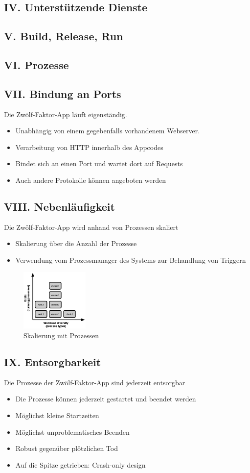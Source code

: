 \documentclass[fleqn,10pt]{SelfArx} %
\begin{document}
\subsection{IV. Unterstützende Dienste}
\subsection{V. Build, Release, Run}
\subsection{VI. Prozesse}
\subsection{VII. Bindung an Ports}
Die Zwölf-Faktor-App läuft eigenständig.
\begin{itemize}
	\item Unabhängig von einem gegebenfalls vor\-han\-den\-em Web\-server.
	\item Verarbeitung von HTTP innerhalb des Appcodes
	\item Bindet sich an einen Port und wartet dort auf Requests
	\item Auch andere Protokolle können angeboten werden
\end{itemize}
\subsection{VIII. Nebenläufigkeit}
Die Zwölf-Faktor-App wird anhand von Prozessen skaliert
\begin{itemize}
	\item Skalierung über die Anzahl der Prozesse
	\item Verwendung vom Prozessmanager des Systems zur Behandlung \newline von Triggern
\end{itemize}
\begin{figure}[htpb]
	\centering
	\includegraphics[width=0.3\textwidth]{../process-types.png}
	\caption{Skalierung mit Prozessen~\cite{factor-concurrency}}
\end{figure}
\subsection{IX. Entsorgbarkeit}
Die Prozesse der Zwölf-Faktor-App sind jederzeit entsorgbar
\begin{itemize}
	\item Die Prozesse können jederzeit gestartet und beendet werden
	\item Möglichst kleine Startzeiten
	\item Möglichst unproblematisches Beenden
	\item Robust gegenüber plötzlichen Tod
	\item Auf die Spitze getrieben: Crash-only design
\end{itemize}
\end{document}
